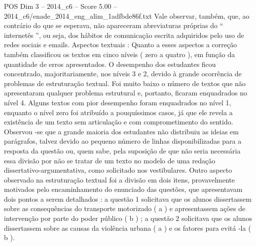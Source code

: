 \begin{textsample}{POS Dim 3 – 2014\_c6 – Score 5.00 – 2014\_c6/enade\_2014\_eng\_alim\_1adfbde86f.txt}
Vale observar, também, que, ao contrário do que se esperava, não apareceram abreviaturas próprias do “ internetês ”, ou seja, dos hábitos de comunicação escrita adquiridos pelo uso de redes sociais e emails.
Aspectos textuais : Quanto a esses aspectos a correção também classificou os textos em cinco níveis ( zero a quatro ), em função da quantidade de erros apresentados.
O desempenho dos estudantes ficou concentrado, majoritariamente, nos níveis 3 e 2, devido à grande ocorrência de problemas de estruturação textual.
Foi muito baixo o número de textos que não apresentaram qualquer problema estrutural e, portanto, ficaram enquadrados no nível 4.
Alguns textos com pior desempenho foram enquadrados no nível 1, enquanto o nível zero foi atribuído a pouquíssimos casos, já que ele revela a existência de um texto sem articulação e com comprometimento do sentido.
Observou -se que a grande maioria dos estudantes não distribuiu as ideias em parágrafos, talvez devido ao pequeno número de linhas disponibilizadas para a resposta da questão ou, quem sabe, pela suposição de que não seria necessária essa divisão por não se tratar de um texto no modelo de uma redação dissertativo-argumentativa, como solicitado nos vestibulares.
Outro aspecto observado na estruturação textual foi a divisão em dois itens, provavelmente motivados pelo encaminhamento do enunciado das questões, que apresentavam dois pontos a serem detalhados : a questão 1 solicitava que os alunos dissertassem sobre as consequências do transporte motorizado ( a ) e apresentassem ações de intervenção por parte do poder público ( b ) ; a questão 2 solicitava que os alunos dissertassem sobre as causas da violência urbana ( a ) e os fatores para evitá -la ( b ).

\end{textsample}
